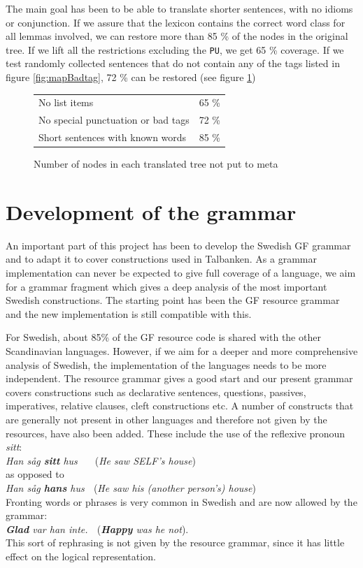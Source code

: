 \documentclass[10pt, a4paper]{article}
\begin{document}
The main goal has been to be able to translate shorter sentences, with no
idioms or conjunction.
If we assure that the lexicon contains the correct word class for all lemmas
involved, we
can restore more than 85 \% of the nodes in the original tree.
If we lift all the restrictions excluding the \verb|PU|, we get
65 \% coverage. 
If we test randomly collected sentences that do not contain any of the tags listed
in figure \ref{fig:mapBadtag}, 72 \% can be restored (see figure \ref{tab:mappres})

\begin{figure}[h]
\begin{tabular}{|ll|}
\hline
No list items & 65 \%\\
No special punctuation or bad tags& 72 \%\\
Short sentences with known words & 85 \%\\
\hline
\end{tabular}
\caption{Number of nodes in each translated tree not put to meta}
\label{tab:mappres}
\end{figure}

\section{Development of the grammar}
\label{sec:grammar}
An important part of this project has been to develop the Swedish GF grammar and
to adapt it to cover constructions used in Talbanken. As a grammar
implementation can never be expected to give
full coverage of a language, we aim for a grammar fragment which gives a deep
analysis of the most important Swedish constructions.
The starting point has been the GF resource grammar and the new implementation is
still compatible with this.

For Swedish, about 85\% of the GF resource code is shared with the other Scandinavian
languages. 
However, if we aim for a deeper and more comprehensive analysis of Swedish,
the implementation of the languages needs to be more independent.
The resource grammar gives a good start and our present grammar 
covers constructions such as declarative sentences, questions, passives,
imperatives, relative clauses, cleft constructions etc.
A number of constructs that are generally not present in other languages and
therefore not given by the resources, have also been added. These include the use of
the reflexive pronoun \emph{sitt}: \\
\emph{Han s{\aa}g \textbf{sitt} hus} $\; \; \; \;$ (\emph{He saw SELF's house}) $\;$ \\
as opposed to \\
\emph{Han s{\aa}g \textbf{hans} hus} $\;$ (\emph{He saw his (another person's) house}) \\
Fronting words or phrases is very common in Swedish and are now allowed by the grammar:\\
\emph{\textbf{Glad} var han inte.} $\;$ (\emph{\textbf{Happy} was he not}). \\
This sort of rephrasing is not given by the resource grammar, since it
has little effect on the logical representation.
\end{document}
